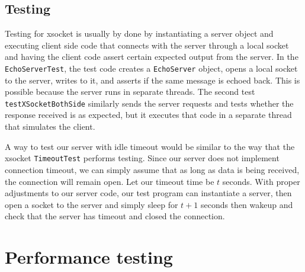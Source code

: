 \documentclass[letterpaper,12pt]{article}
\begin{document}
\subsection{Testing}

Testing for xsocket is usually by done by instantiating a server object and executing client side code that connects with the server through a local socket and having the client code assert certain expected output from the server. In the \texttt{EchoServerTest}, the test code creates a \texttt{EchoServer} object, opens a local socket to the server, writes to it, and asserts if the same message is echoed back. This is possible because the server runs in separate threads. The second test \texttt{testXSocketBothSide} similarly sends the server requests and tests whether the response received is as expected, but it executes that code in a separate thread that simulates the client.

A way to test our server with idle timeout would be similar to the way that the xsocket \texttt{TimeoutTest} performs testing. Since our server does not implement connection timeout, we can simply assume that as long as data is being received, the connection will remain open. Let our timeout time be $t$ seconds. With proper adjustments to our server code, our test program can instantiate a server, then open a socket to the server and simply sleep for $t + 1$ seconds then wakeup and check that the server has timeout and closed the connection.

\section{Performance testing}
\end{document}
